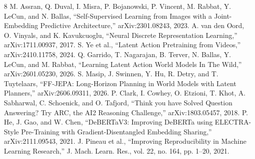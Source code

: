 \documentclass[conference]{IEEEtran}
\begin{document}
\begin{thebibliography}{8}
 M. Assran, Q. Duval, I. Misra, P. Bojanowski, P. Vincent, M. Rabbat, Y. LeCun, and N. Ballas, ``Self-Supervised Learning from Images with a Joint-Embedding Predictive Architecture,'' arXiv:2301.08243, 2023.
 A. van den Oord, O. Vinyals, and K. Kavukcuoglu, ``Neural Discrete Representation Learning,'' arXiv:1711.00937, 2017.
 S. Ye et al., ``Latent Action Pretraining from Videos,'' arXiv:2410.11758, 2024.
 Q. Garrido, T. Nagarajan, B. Terver, N. Ballas, Y. LeCun, and M. Rabbat, ``Learning Latent Action World Models In The Wild,'' arXiv:2601.05230, 2026.
 S. Masip, J. Swinnen, Y. Hu, R. Detry, and T. Tuytelaars, ``FF-JEPA: Long-Horizon Planning in World Models with Latent Planners,'' arXiv:2606.09311, 2026.
 P. Clark, I. Cowhey, O. Etzioni, T. Khot, A. Sabharwal, C. Schoenick, and O. Tafjord, ``Think you have Solved Question Answering? Try ARC, the AI2 Reasoning Challenge,'' arXiv:1803.05457, 2018.
 P. He, J. Gao, and W. Chen, ``DeBERTaV3: Improving DeBERTa using ELECTRA-Style Pre-Training with Gradient-Disentangled Embedding Sharing,'' arXiv:2111.09543, 2021.
 J. Pineau et al., ``Improving Reproducibility in Machine Learning Research,'' J. Mach. Learn. Res., vol. 22, no. 164, pp. 1--20, 2021.
\end{thebibliography}
\end{document}
